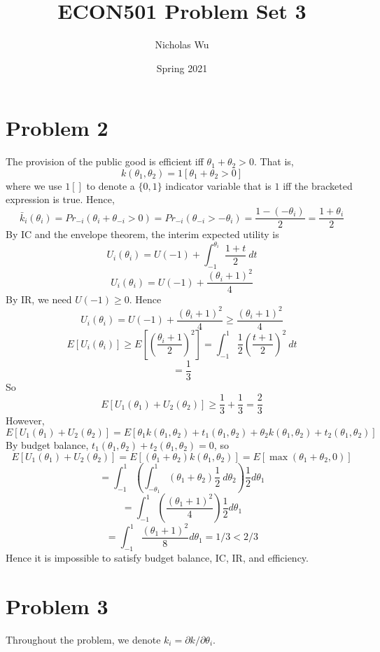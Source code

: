 \documentclass[10pt,letter]{article}
\begin{document}


\title{ECON501 Problem Set 3}

\author{Nicholas Wu}

\date{Spring 2021}

\maketitle

\section*{Problem 2}
The provision of the public good is efficient iff $\theta_1 + \theta_2 > 0$. That is, \[ k(\theta_1, \theta_2) = 1[\theta_1 + \theta_2 > 0]\]
where we use $1[]$ to denote a $\{ 0,1\}$ indicator variable that is $1$ iff the bracketed expression is true. Hence,
\[ \bar{k}_i(\theta_i) = Pr_{-i}(\theta_i + \theta_{-i} > 0) =Pr_{-i}( \theta_{-i} > -\theta_i )= \frac{1-(-\theta_i)}{2}= \frac{1 + \theta_i}{2} \]
By IC and the envelope theorem, the interim expected utility is
\[ U_i(\theta_i) = U(-1) + \int_{-1}^{\theta_i} \frac{1 + t}{2} \ dt  \]
\[ U_i(\theta_i) = U(-1) + \frac{(\theta_i + 1)^2}{4}   \]
By IR, we need $U(-1) \ge 0$. Hence
\[ U_i(\theta_i) = U(-1) + \frac{(\theta_i + 1)^2}{4} \ge \frac{(\theta_i + 1)^2}{4} \]
\[ E[U_i(\theta_i)] \ge E\left[\left(\frac{\theta_i + 1}{2}\right)^2 \right] = \int_{-1}^1 \frac{1}{2} \left(\frac{t + 1}{2}\right)^2 \ dt\]
\[ = \frac{1}{3} \]
So
\[ E[U_1(\theta_1) + U_2(\theta_2)] \ge \frac{1}{3} + \frac{1}{3} = \frac{2}{3} \]
However,
\[ E[U_1(\theta_1) + U_2(\theta_2)] = E[\theta_1 k(\theta_1,\theta_2)  + t_1(\theta_1, \theta_2) + \theta_2 k(\theta_1,\theta_2) + t_2(\theta_1, \theta_2)]  \]
By budget balance, $t_1(\theta_1, \theta_2)+t_2(\theta_1, \theta_2) = 0$, so
\[ E[U_1(\theta_1) + U_2(\theta_2)] = E[(\theta_1 + \theta_2)k(\theta_1,\theta_2) ] = E[\max(\theta_1 + \theta_2, 0)] \]
\[ = \int_{-1}^1 \left(\int_{-\theta_1}^1 (\theta_1 + \theta_2)\frac{1}{2} \ d\theta_2 \right) \frac{1}{2} d\theta_1 \]
\[ = \int_{-1}^1 \left( \frac{(\theta_1 + 1)^2}{4} \right)  \frac{1}{2}d\theta_1 \]
\[ = \int_{-1}^1 \frac{(\theta_1 + 1)^2}{8} d\theta_1 = 1/3 < 2/3 \]
Hence it is impossible to satisfy budget balance, IC, IR, and efficiency.

\section*{Problem 3}
Throughout the problem, we denote $k_i = \partial k/\partial \theta_i$.
\end{document}
